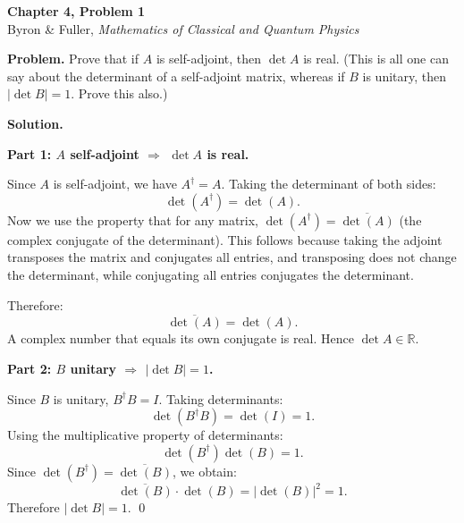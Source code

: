 \documentclass[12pt]{article}
\begin{document}
\begin{center}
{\Large\bfseries Chapter 4, Problem 1}\\[6pt]
Byron \& Fuller, \textit{Mathematics of Classical and Quantum Physics}
\end{center}

\bigskip

\textbf{Problem.} Prove that if $A$ is self-adjoint, then $\det A$ is real. (This is all one can say about the determinant of a self-adjoint matrix, whereas if $B$ is unitary, then $|\det B| = 1$. Prove this also.)

\bigskip
\textbf{Solution.}

\textbf{Part 1: $A$ self-adjoint $\Rightarrow$ $\det A$ is real.}

Since $A$ is self-adjoint, we have $A^\dagger = A$. Taking the determinant of both sides:
\[
\det(A^\dagger) = \det(A).
\]
Now we use the property that for any matrix, $\det(A^\dagger) = \overline{\det(A)}$ (the complex conjugate of the determinant). This follows because taking the adjoint transposes the matrix and conjugates all entries, and transposing does not change the determinant, while conjugating all entries conjugates the determinant.

Therefore:
\[
\overline{\det(A)} = \det(A).
\]
A complex number that equals its own conjugate is real. Hence $\det A \in \mathbb{R}$.

\bigskip
\textbf{Part 2: $B$ unitary $\Rightarrow$ $|\det B| = 1$.}

Since $B$ is unitary, $B^\dagger B = I$. Taking determinants:
\[
\det(B^\dagger B) = \det(I) = 1.
\]
Using the multiplicative property of determinants:
\[
\det(B^\dagger)\det(B) = 1.
\]
Since $\det(B^\dagger) = \overline{\det(B)}$, we obtain:
\[
\overline{\det(B)} \cdot \det(B) = |\det(B)|^2 = 1.
\]
Therefore $|\det B| = 1$. \qed
\end{document}
